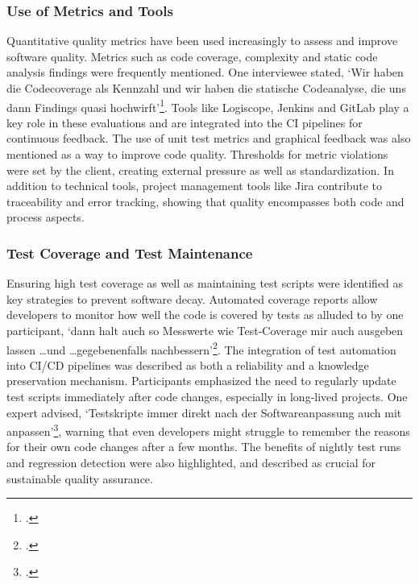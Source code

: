 \subsubsection{Use of Metrics and Tools}
Quantitative quality metrics have been used increasingly to assess and improve software quality. Metrics such as code coverage, complexity and static code analysis findings were frequently mentioned. One interviewee stated, `Wir haben die Codecoverage als Kennzahl und wir haben die statische Codeanalyse,
die uns dann Findings quasi hochwirft'\footcite[81]{Interview32025}. Tools like Logiscope, Jenkins and GitLab play a key role in these evaluations and are integrated into the CI pipelines for continuous feedback.
The use of unit test metrics and graphical feedback was also mentioned as a way to improve code quality. Thresholds for metric violations were set by the client, creating external pressure as well as standardization. In addition to technical tools, project management tools like Jira contribute to traceability and error tracking,
showing that quality encompasses both code and process aspects.

\subsubsection{Test Coverage and Test Maintenance}
Ensuring high test coverage as well as maintaining test scripts were identified as key strategies to prevent software decay. Automated coverage reports allow developers to monitor how well the code is covered by tests as alluded to by one participant, `dann halt auch so Messwerte wie Test-Coverage mir auch ausgeben lassen \ldots und \ldots gegebenenfalls nachbessern'\footcite[81]{Interview32025}.
The integration of test automation into CI/CD pipelines was described as both a reliability and a knowledge preservation mechanism.
Participants emphasized the need to regularly update test scripts immediately after code changes, especially in long-lived projects. One expert advised, `Testskripte immer direkt nach der Softwareanpassung auch mit anpassen'\footcite[66]{Interview12025}, warning that even developers might struggle to remember the reasons for their own code changes after a few months.
The benefits of nightly test runs and regression detection were also highlighted, and described as crucial for sustainable quality assurance.

